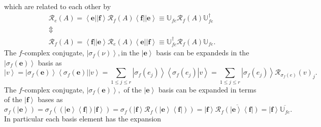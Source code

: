 \documentclass[aps,preprint]{revtex4}
\begin{document}
which are related to each other by 
\begin{gather}
\mathcal{R}_{e}\left( A\right) =\left\langle \mathbf{e}\right\vert
\left\vert \mathbf{f}\right\rangle \mathcal{R}_{f}\left( A\right)
\left\langle \mathbf{f}\right\vert \left\vert \mathbf{e}\right\rangle \equiv 
\mathbb{U}_{fe}\mathcal{R}_{f}\left( A\right) \mathbb{U}_{fe}^{\dagger } \\
\Updownarrow \\
\mathcal{R}_{f}\left( A\right) =\left\langle \mathbf{f}\right\vert
\left\vert \mathbf{e}\right\rangle \mathcal{R}_{e}\left( A\right)
\left\langle \mathbf{e}\right\vert \left\vert \mathbf{f}\right\rangle \equiv 
\mathbb{U}_{fe}^{\dagger }\mathcal{R}_{f}\left( A\right) \mathbb{U}_{fe}.
\end{gather}%
The $f$-complex conjugate, $\left\vert \sigma _{f}\left( \nu \right)
\right\rangle ,$in the $\left\vert \mathbf{e}\right\rangle $ basis can be
expandeds in the $\left\vert \sigma _{f}\left( \mathbf{e}\right)
\right\rangle $ basis as 
\begin{equation}
\left\vert v\right\rangle =\left\vert \sigma _{f}\left( \mathbf{e}\right)
\right\rangle \left\langle \sigma _{f}\left( \mathbf{e}\right) \right\vert
\left\vert v\right\rangle =\sum_{1\leq j\leq r}\left\vert \sigma _{f}\left(
e_{j}\right) \right\rangle \left\langle \left. \sigma _{f}\left(
e_{j}\right) \right\vert v\right\rangle =\sum_{1\leq j\leq r}\left\vert
\sigma _{f}\left( e_{j}\right) \right\rangle \mathcal{R}_{\sigma _{f}\left(
e\right) }\left( v\right) _{j}.
\end{equation}%
The $f$-complex conjugate, $\left\vert \sigma _{f}\left( \mathbf{e}\right)
\right\rangle ,$ of the $\left\vert \mathbf{e}\right\rangle $ basis can be
expanded in terms of the $\left\vert \mathbf{f}\right\rangle $ bases as 
\begin{equation}
\sigma _{f}\left( \left\vert \mathbf{e}\right\rangle \right) =\sigma
_{f}\left( \left( \left\vert \mathbf{e}\right\rangle \left\langle \mathbf{f}%
\right\vert \right) \left\vert \mathbf{f}\right\rangle \right) =\sigma
_{f}\left( \left\vert \mathbf{f}\right\rangle \mathcal{R}_{f}\left(
\left\vert \mathbf{e}\right\rangle \left\langle \mathbf{f}\right\vert
\right) \right) =\left\vert \mathbf{f}\right\rangle \overline{\mathcal{R}%
_{f}\left( \left\vert \mathbf{e}\right\rangle \left\langle \mathbf{f}%
\right\vert \right) }=\left\vert \mathbf{f}\right\rangle \overline{\mathbb{U}%
_{fe}}.
\end{equation}%
In particular each basis element has the expansion 
\end{document}
